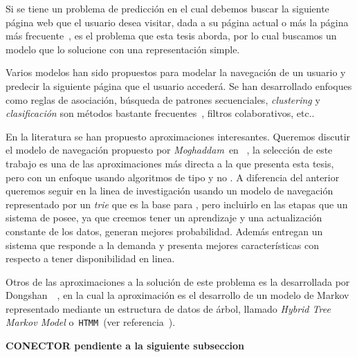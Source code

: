 

Si se tiene un problema de predicción en el cual debemos buscar la siguiente página web que el usuario desea visitar, dada a su página actual o más la página más frecuente~\cite{Poornalatha2012}, es el problema que esta tesis aborda, por lo cual buscamos un modelo que lo solucione con una representación simple.


Varios modelos han sido propuestos para modelar la navegación de un usuario y predecir la siguiente página que el usuario accederá. Se han desarrollado enfoques como  reglas de asociación, búsqueda de patrones secuenciales, \emph{clustering} y \emph{clasificación} son métodos bastante frecuentes~\cite{Moghaddam2009}, filtros colaborativos, etc.. 


En la literatura se han propuesto aproximaciones interesantes. Queremos discutir el modelo de navegación propuesto por \emph{Moghaddam}~\etal en ~\cite{Moghaddam2009}, la selección de este trabajo es una de las aproximaciones más directa a la que presenta esta tesis, pero con un enfoque usando algoritmos de tipo \losslessdatacompression y no \machinelearning. A  diferencia del anterior queremos seguir en la linea de investigación usando un modelo de navegación representado por un \emph{trie} que es la base para \lzSieteOcho, pero incluirlo en las etapas que un sistema de \machinelearning posee, ya que creemos tener un aprendizaje  y una actualización constante de los datos, generan mejores  probabilidad. Además entregan un sistema que responde a la demanda y presenta mejores características con respecto a tener disponibilidad en linea.

Otros de las aproximaciones a la solución de este problema es la desarrollada por {Dongshan}~\etal~\cite{Dongshan2002}, en la cual la aproximación es el desarrollo de un modelo de Markov representado mediante un estructura de datos de árbol, llamado \emph{Hybrid Tree Markov Model} o~\texttt{HTMM}~(ver referencia~\cite{Dongshan2002}).
\uncm
 
 
 \textbf{CONECTOR pendiente a la siguiente subseccion}

 




